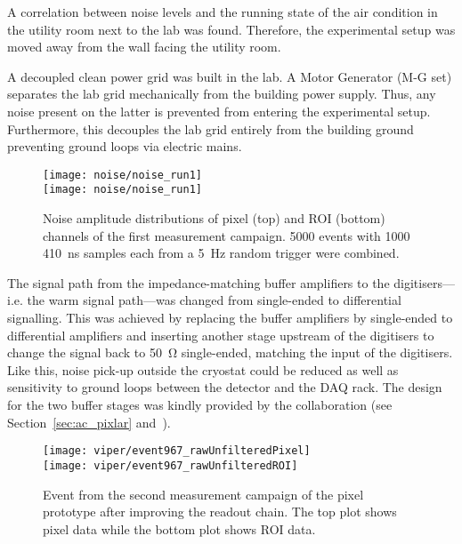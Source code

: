 A correlation between noise levels and the running state of the air condition in the utility room next to the lab was found.
Therefore, the experimental setup was moved away from the wall facing the utility room.

A decoupled clean power grid was built in the lab.
A Motor Generator (M-G set) separates the lab grid mechanically from the building power supply.
Thus, any noise present on the latter is prevented from entering the experimental setup.
Furthermore, this decouples the lab grid entirely from the building ground preventing ground loops via electric mains.

\begin{figure}[htb]
	\centering
	\texttt{[image: noise/noise\_run1]} \\
	\texttt{[image: noise/noise\_run1]}
	\caption{Noise amplitude distributions of pixel (top) and ROI (bottom) channels of the first measurement campaign.
	\num{5000} events with \num{1000} \SI{410}{\nano\second} samples each from a \SI{5}{\hertz} random trigger were combined.}
	\label{fig:electronics_noise-run1}
\end{figure}

The signal path from the impedance-matching buffer amplifiers to the digitisers---i.e. the warm signal path---was changed from single-ended to differential signalling.
This was achieved by replacing the buffer amplifiers by single-ended to differential amplifiers and inserting another stage upstream of the digitisers to change the signal back to \SI{50}{\ohm} single-ended, matching the input of the digitisers.
Like this, noise pick-up outside the cryostat could be reduced as well as sensitivity to ground loops between the detector and the DAQ rack.
The design for the two buffer stages was kindly provided by the \lariat{} collaboration (see Section~\ref{sec:ac_pixlar} and~\cite{lariat}).

\begin{figure}[htb]
	\centering
	\texttt{[image: viper/event967\_rawUnfilteredPixel]}\\
	\texttt{[image: viper/event967\_rawUnfilteredROI]}
	\caption{Event from the second measurement campaign of the pixel prototype after improving the readout chain.
	The top plot shows pixel data while the bottom plot shows ROI data.}
	\label{fig:electronics_event-run2}
\end{figure}


